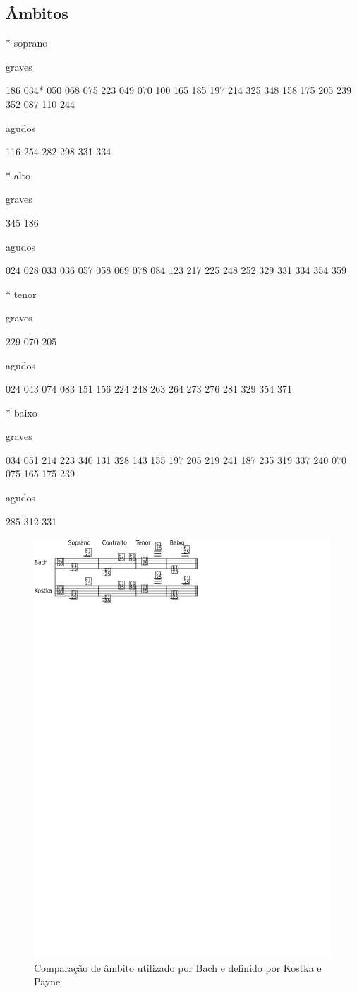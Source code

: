 \documentclass{article}
\begin{document}
\subsection{Âmbitos}
\label{sec:ambitos}


* soprano

graves

186 034* 050 068 075 223 049 070 100 165 185 197 214 325 348 158 175
205 239 352 087 110 244

agudos

116 254 282 298 331 334

* alto

graves

345 186

agudos

024 028 033 036 057 058 069 078 084 123 217 225 248 252 329 331 334
354 359

* tenor

graves

229 070 205

agudos

024 043 074 083 151 156 224 248 263 264 273 276 281 329 354 371

* baixo

graves

034 051 214 223 340 131 328 143 155 197 205 219 241 187 235 319 337
240 070 075 165 175 239

agudos

285 312 331

\begin{figure}
  \centering
  \includegraphics[scale=2.5]{ambitos}
  \caption{Comparação de âmbito utilizado por Bach e definido por
    Kostka e Payne}
  \label{fig:ambito-kostka}
\end{figure}
\end{document}
